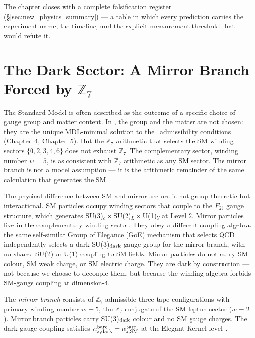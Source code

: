 \documentclass[11pt,openany]{book}
\theoremstyle{remark}
\newcommand{\GTE}{\text{GTE}}
\newcommand{\PSC}{\text{PSC}}
\newcommand{\ZS}{\mathbb{Z}_7}
\newcommand{\CatAD}{\textbf{A/D}}
\begin{document}
The chapter closes with a complete falsification register (\S\ref{sec:new_physics_summary})
— a table in which every prediction carries the experiment name, the timeline, and the
explicit measurement threshold that would refute it.

\section{The Dark Sector: A Mirror Branch Forced by \texorpdfstring{$\mathbb{Z}_7$}{Z7}}
\label{sec:dark_sector}

The Standard Model is often described as the outcome of a specific choice of gauge group
and matter content.  In \GTE, the group and the matter are not chosen: they are the unique
MDL-minimal solution to the \PSC\ admissibility conditions (Chapter~4, Chapter~5).  But
the $\ZS$ arithmetic that selects the SM winding sectors $\{0,2,3,4,6\}$ does not
exhaust $\mathbb{Z}_7$.  The complementary sector, winding number $w = 5$, is as
consistent with $\ZS$ arithmetic as any SM sector.  The mirror branch is not a model
assumption --- it is the arithmetic remainder of the same calculation that generates
the SM.

The physical difference between SM and mirror sectors is not group-theoretic but
interactional.  SM particles occupy winding sectors that couple to the $F_{21}$ gauge
structure, which generates SU(3)$_c\times$SU(2)$_L\times$U(1)$_Y$ at Level 2.  Mirror
particles live in the complementary winding sector.  They obey a different coupling
algebra: the same self-similar Group of Elegance (GoE) mechanism that selects QCD
independently selects a dark SU(3)$_{\rm dark}$ gauge group for the mirror branch, with
no shared SU(2) or U(1) coupling to SM fields.  Mirror particles do not carry SM
colour, SM weak charge, or SM electric charge.  They are dark by construction ---
not because we choose to decouple them, but because the winding algebra forbids
SM-gauge coupling at dimension-4.

\begin{tcolorbox}[colback=green!5,colframe=green!50!black,
  title={Definition: Mirror Branch (\CatAD)}]
The \emph{mirror branch} consists of $\ZS$-admissible three-tape configurations
with primary winding number $w = 5$, the $\mathbb{Z}_7$ conjugate of the SM
lepton sector ($w = 2$).  Mirror branch particles carry SU(3)$_{\rm dark}$ colour
and no SM gauge charges.  The dark gauge coupling satisfies
$\alpha_{s,\rm dark}^{\rm bare} = \alpha_{s,\rm SM}^{\rm bare}$ at the
Elegant Kernel level~\cite{SpivackMirrorBraidAtlas}.
\end{tcolorbox}
\end{document}
